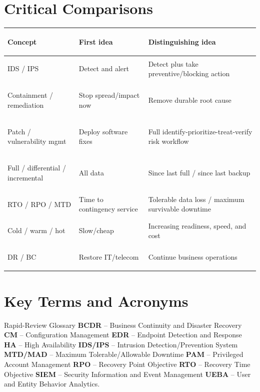 \documentclass[10pt,letterpaper]{article}
\begin{document}
\section{\color{navy}Critical Comparisons}
\begin{center}\small
\begin{tabularx}{\textwidth}{>{\bfseries\color{navy}\raggedright\arraybackslash}p{}>{\raggedright\arraybackslash}X>{\raggedright\arraybackslash}X}
\toprule Concept & First idea & Distinguishing idea\\\midrule
IDS / IPS & Detect and alert & Detect plus take preventive/blocking action\\
Containment / remediation & Stop spread/impact now & Remove durable root cause\\
Patch / vulnerability mgmt & Deploy software fixes & Full identify-prioritize-treat-verify risk workflow\\
Full / differential / incremental & All data & Since last full / since last backup\\
RTO / RPO / MTD & Time to contingency service & Tolerable data loss / maximum survivable downtime\\
Cold / warm / hot & Slow/cheap & Increasing readiness, speed, and cost\\
DR / BC & Restore IT/telecom & Continue business operations\\
\bottomrule
\end{tabularx}
\end{center}

\section{\color{navy}Key Terms and Acronyms}
\begin{summarybox}{Rapid-Review Glossary}
\textbf{BCDR} -- Business Continuity and Disaster Recovery \quad
\textbf{CM} -- Configuration Management \quad
\textbf{EDR} -- Endpoint Detection and Response \quad
\textbf{HA} -- High Availability \quad
\textbf{IDS/IPS} -- Intrusion Detection/Prevention System \quad
\textbf{MTD/MAD} -- Maximum Tolerable/Allowable Downtime \quad
\textbf{PAM} -- Privileged Account Management \quad
\textbf{RPO} -- Recovery Point Objective \quad
\textbf{RTO} -- Recovery Time Objective \quad
\textbf{SIEM} -- Security Information and Event Management \quad
\textbf{UEBA} -- User and Entity Behavior Analytics.
\end{summarybox}
\end{document}
